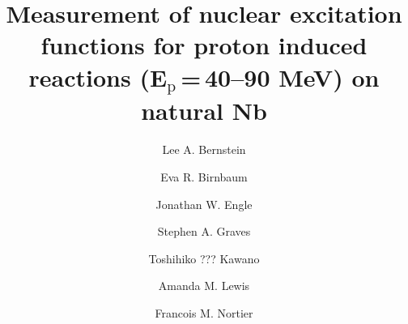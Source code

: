 \documentclass[3p]{elsarticle}
\begin{document}
\begin{frontmatter}
% 
% 
% 


\author[lbl,ucb]{Lee A. Bernstein}


\author[lanl]{Eva R. Birnbaum}

\author[uwm]{Jonathan W. Engle}


\author[iowa]{Stephen A. Graves}

\author[tlanl]{Toshihiko ??? Kawano}


\author[ucb]{Amanda M. Lewis}


\author[lanl]{Francois M. Nortier}

\address[ucb]{Department of Nuclear Engineering, University of California, Berkeley,  Berkeley, CA 94720, USA}
\address[lbl]{Nuclear Science Division, Lawrence Berkeley National Laboratory,  Berkeley, CA 94720, USA}
\address[uwm]{Department of Medical Physics, University of Wisconsin -- Madison,  Madison, WI 53705, USA}
\address[lanl]{Isotope Production Facility, Chemistry Division, Los Alamos National Laboratory,  Los Alamos, NM 87544, USA}
\address[iowa]{Department of Radiation Oncology, University of Iowa,  Iowa City, IA 52242, USA}
\address[tlanl]{Nuclear Physics Group, Theoretical Division, Los Alamos National Laboratory,  Los Alamos, NM 87544, USA}

% 
% 
% 
\title{Measurement of nuclear excitation functions for proton induced reactions (E\texorpdfstring{$_{\text{p}}$\,=\,}{Ep = 40--90}40--90 MeV) on natural Nb}


\end{frontmatter}
\end{document}
